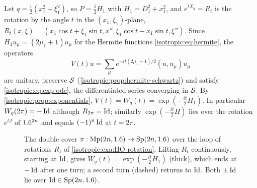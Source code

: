 \begin{example}\label{isotropic:exa:HO-rotation}
Let $q=\frac12(x_1^2+\xi_1^2)$, so $P=\frac12H_1$ with $H_1=D_1^2+x_1^2$, and
$e^{tX_q}=R_t$ is the rotation by the angle $t$ in the $(x_1,\xi_1)$-plane,
$R_t(x,\xi)=(x_1\cos t+\xi_1\sin t,x'',\xi_1\cos t-x_1\sin t,\xi'')$. Since
$H_1u_\mu=(2\mu_1+1)u_\mu$ for the Hermite functions
\eqref{isotropic:eq:hermite}, the operators
\begin{equation*}
  V(t)u=\sum_\mu e^{-it(2\mu_1+1)/2}(u,u_\mu)u_\mu
\end{equation*}
are unitary, preserve $\mathcal{S}$ (\cref{isotropic:prop:hermite-schwartz}) and
satisfy \eqref{isotropic:eq:exp-ode}, the differentiated series converging in
$\mathcal{S}$. By \cref{isotropic:prop:exponentials}, $V(t)=W_q(t)=\exp(-\frac{it}2H_1)$.
In particular $W_q(2\pi)=-\operatorname{Id}$ although $R_{2\pi}=\operatorname{Id}$; similarly
$\exp(-\frac{it}2H)$ lies over the rotation $e^{tJ}$ of $1.6^{2n}$ and equals
$(-1)^n\operatorname{Id}$ at $t=2\pi$.
\end{example}

\begin{figure}[htbp]
\centering
{}
\caption[The double cover over a loop of rotations]{The double cover
$\pi:\mathrm{Mp}(2n,1.6)\to\mathrm{Sp}(2n,1.6)$ over the loop of rotations
$R_t$ of \cref{isotropic:exa:HO-rotation}. Lifting $R_t$ continuously,
starting at $\operatorname{Id}$, gives $W_q(t)=\exp(-\frac{it}2H_1)$ (thick), which ends
at $-\operatorname{Id}$ after one turn; a second turn (dashed) returns to $\operatorname{Id}$. Both
$\pm\operatorname{Id}$ lie over $\operatorname{Id}\in\mathrm{Sp}(2n,1.6)$.}
\label{isotropic:fig:double-cover}
\end{figure}

